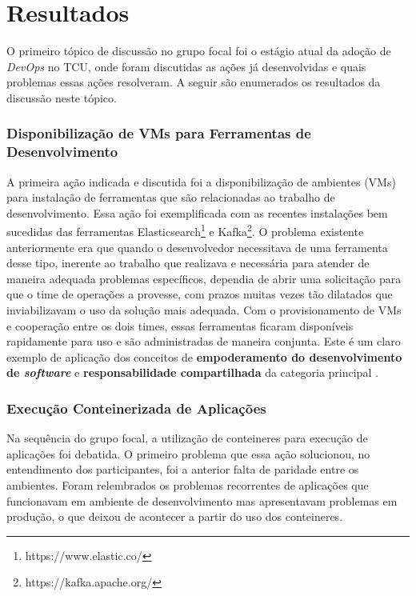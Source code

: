 \section{Resultados}\label{secao_resultados_grupo}

O primeiro tópico de discussão no grupo focal foi o estágio atual da adoção de
{\it DevOps} no \acrshort{TCU}, onde foram discutidas as ações já desenvolvidas
e quais problemas essas ações resolveram. A seguir são enumerados os
resultados da discussão neste tópico.

\subsubsection{Disponibilização de \acrshort{VM}s para Ferramentas de Desenvolvimento}

A primeira ação indicada e discutida foi a disponibilização de ambientes (\acrshort{VM}s)
para instalação de ferramentas que são relacionadas ao trabalho de
desenvolvimento. Essa ação foi exemplificada com as recentes instalações bem
sucedidas das ferramentas Elasticsearch\footnote{https://www.elastic.co/} e Kafka\footnote{https://kafka.apache.org/}.
O problema existente anteriormente era que quando o desenvolvedor necessitava de
uma ferramenta desse tipo, inerente ao trabalho que realizava e necessária para
atender de maneira adequada problemas específicos, dependia de abrir uma
solicitação para que o time de operações a provesse, com prazos muitas vezes
tão dilatados que inviabilizavam o uso da solução mais adequada. Com o
provisionamento de \acrshort{VM}s e cooperação entre os dois times, essas
ferramentas ficaram disponíveis rapidamente para uso e são administradas de
maneira conjunta. Este é um claro exemplo de aplicação dos conceitos de
{\bf empoderamento do desenvolvimento de \emph{software}} e {\bf responsabilidade
compartilhada} da categoria principal .

\subsubsection{Execução Conteinerizada de Aplicações}

Na sequência do grupo focal, a utilização de conteineres para execução de
aplicações foi debatida. O primeiro problema que essa ação solucionou, no
entendimento dos participantes, foi a anterior falta de paridade entre os
ambientes. Foram relembrados os problemas recorrentes de aplicações que
funcionavam em ambiente de desenvolvimento mas apresentavam problemas em
produção, o que deixou de acontecer a partir do uso dos conteineres.

